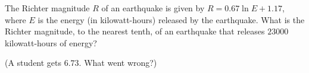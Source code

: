The Richter magnitude $R$ of an earthquake is given by $R=0.67\ln E+1.17$, where $E$ is the energy (in kilowatt-hours) released by the earthquake. What is the Richter magnitude, to the nearest tenth, of an earthquake that releases $23000$ kilowatt-hours of energy?

(A student gets $6.73$. What went wrong?)
